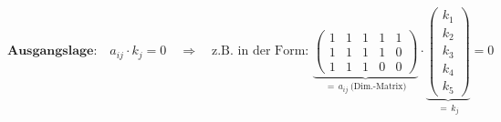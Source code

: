 \centering
\section*{}

\small

%
\begin{equation*}
    \textbf{Ausgangslage:} \quad a_{ij}\cdot k_j = 0 \quad \Rightarrow \quad \text{z.B. in der Form: } \underbrace{\left(
    \begin{matrix}
        1 & 1 & 1 & 1 & 1 \\
        1 & 1 & 1 & 1 & 0 \\
        1 & 1 & 1 & 0 & 0
    \end{matrix}\right)}_{=\,a_{ij}~\text{(Dim.-Matrix)}}
    \cdot
    \underbrace{\left(\begin{matrix}
        k_1 \\
        k_2 \\
        k_3 \\
        k_4 \\
        k_5
    \end{matrix}\right)}_{=\,k_j}
    = 0
\end{equation*}
\vspace{-3mm}

